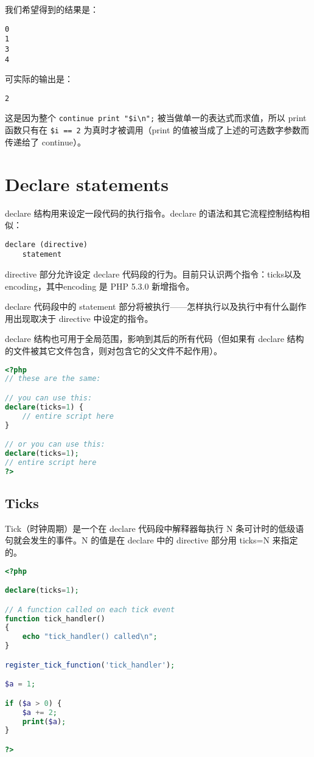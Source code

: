 我们希望得到的结果是：

\begin{verbatim}
0
1
3
4
\end{verbatim}

可实际的输出是：

\begin{verbatim}
2
\end{verbatim}

这是因为整个 \texttt{continue print "\$i\textbackslash n";} 被当做单一的表达式而求值，所以 print 函数只有在 \texttt{\$i == 2} 为真时才被调用（print 的值被当成了上述的可选数字参数而传递给了 continue）。


\section{Declare statements}

declare 结构用来设定一段代码的执行指令。declare 的语法和其它流程控制结构相似：

\begin{verbatim}
declare (directive)
    statement
\end{verbatim}

directive 部分允许设定 declare 代码段的行为。目前只认识两个指令：ticks以及 encoding，其中encoding 是 PHP 5.3.0 新增指令。

declare 代码段中的 statement 部分将被执行——怎样执行以及执行中有什么副作用出现取决于 directive 中设定的指令。

declare 结构也可用于全局范围，影响到其后的所有代码（但如果有 declare 结构的文件被其它文件包含，则对包含它的父文件不起作用）。

\begin{lstlisting}[language=PHP]
<?php
// these are the same:

// you can use this:
declare(ticks=1) {
    // entire script here
}

// or you can use this:
declare(ticks=1);
// entire script here
?>
\end{lstlisting}

\subsection{Ticks}

Tick（时钟周期）是一个在 declare 代码段中解释器每执行 N 条可计时的低级语句就会发生的事件。N 的值是在 declare 中的 directive 部分用 ticks=N 来指定的。

\begin{lstlisting}[language=PHP]
<?php

declare(ticks=1);

// A function called on each tick event
function tick_handler()
{
    echo "tick_handler() called\n";
}

register_tick_function('tick_handler');

$a = 1;

if ($a > 0) {
    $a += 2;
    print($a);
}

?>
\end{lstlisting}

